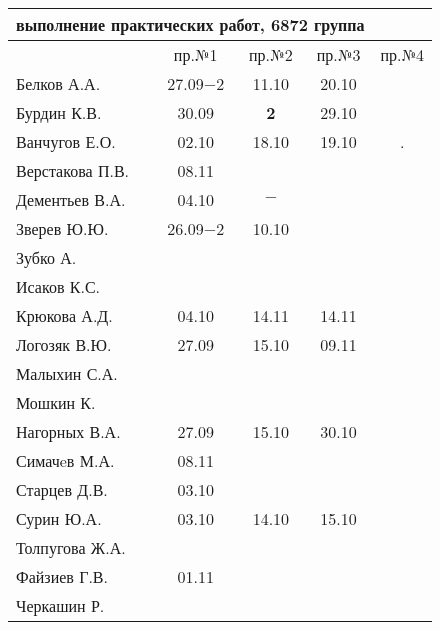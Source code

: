 \documentclass[a4paper,landscape,11pt]{article}
\begin{document}
\newpage
\begin{tabular}{l|cccc}
\multicolumn{4}{c}{выполнение практических работ, 6872 группа} \\
\toprule
& пр.№1 & пр.№2 & пр.№3 & пр.№4\\
\midrule
Белков А.А.    &27.09$-2$&11.10  &20.10&\\   
Бурдин К.В.    &30.09    &{\bf 2}&29.10&\\
Ванчугов Е.О.  &02.10    &18.10  &19.10& .\\
Верстакова П.В.&08.11    &       &     &\\
Дементьев В.А. &04.10    &$-$    &     &\\
Зверев Ю.Ю.    &26.09$-2$&10.10  &     &\\
Зубко А.       &         &       &     &\\
Исаков К.С.    &         &       &     &\\
Крюкова А.Д.   &04.10    &14.11  &14.11&\\
Логозяк В.Ю.   &27.09    &15.10  &09.11&\\
Малыхин С.А.   &         &       &     &\\
Мошкин К.      &         &       &     &\\
Нагорных В.А.  &27.09    &15.10  &30.10&\\
Симачeв М.А.   &08.11    &       &     &\\
Старцев Д.В.   &03.10    &       &     &\\
Сурин Ю.А.     &03.10    &14.10  &15.10&\\
Толпугова Ж.А. &         &       &     &\\
Файзиев Г.В.   &01.11    &       &     &\\
Черкашин Р.    &         &       &     &\\
\bottomrule
\end{tabular}
\end{document}
